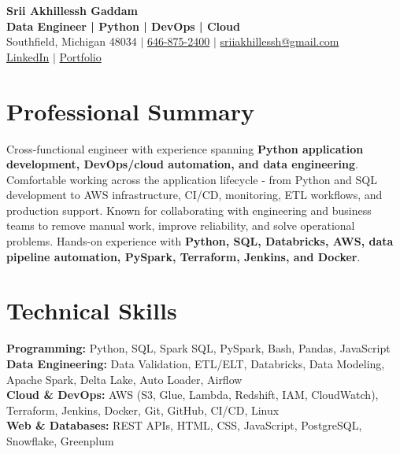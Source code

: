 \documentclass[letterpaper,10pt]{article}
\begin{document}
\fontsize{9.35pt}{10.45pt}\selectfont

\begin{center}
    {\LARGE \textbf{Srii Akhillessh Gaddam}} \\[-1pt]
    \textbf{Data Engineer | Python | DevOps | Cloud} \\[2pt]
    Southfield, Michigan 48034 $|$
    \href{tel:6468752400}{646-875-2400} $|$
    \href{mailto:sriiakhillessh@gmail.com}{sriiakhillessh@gmail.com} \\[1pt]
    \href{https://www.linkedin.com/in/srii-akhiilessh-gaddam-b48668191/}{LinkedIn} $|$
    \href{https://sriiakhillesshg.github.io/portfolio/}{Portfolio}
\end{center}
\vspace{-8pt}

\section{Professional Summary}
\small{Cross-functional engineer with experience spanning \textbf{Python application development, DevOps/cloud automation, and data engineering}. Comfortable working across the application lifecycle - from Python and SQL development to AWS infrastructure, CI/CD, monitoring, ETL workflows, and production support. Known for collaborating with engineering and business teams to remove manual work, improve reliability, and solve operational problems. Hands-on experience with \textbf{Python, SQL, Databricks, AWS, data pipeline automation, PySpark, Terraform, Jenkins, and Docker}.}

\section{Technical Skills}
\small{
\textbf{Programming:} Python, SQL, Spark SQL, PySpark, Bash, Pandas, JavaScript \\
\textbf{Data Engineering:} Data Validation, ETL/ELT, Databricks, Data Modeling, Apache Spark, Delta Lake, Auto Loader, Airflow \\
\textbf{Cloud \& DevOps:} AWS (S3, Glue, Lambda, Redshift, IAM, CloudWatch), Terraform, Jenkins, Docker, Git, GitHub, CI/CD, Linux \\
\textbf{Web \& Databases:} REST APIs, HTML, CSS, JavaScript, PostgreSQL, Snowflake, Greenplum
}

\end{document}
